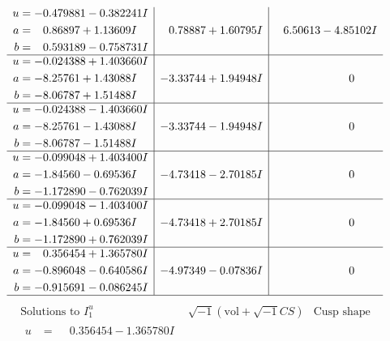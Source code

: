 \documentclass[1p]{elsarticle_modified}
\theoremstyle{definition}
\newcommand{\I}{\sqrt{-1}}
\begin{document}
$$\begin{array}{c|c|c}
\begin{aligned}
u &= -0.479881 - 0.382241 I \\
a &= \phantom{-}0.86897 + 1.13609 I \\
b &= \phantom{-}0.593189 - 0.758731 I\end{aligned}
 & \phantom{-}0.78887 + 1.60795 I & \phantom{-}6.50613 - 4.85102 I \\ \hline\begin{aligned}
u &= -0.024388 + 1.403660 I \\
a &= -8.25761 + 1.43088 I \\
b &= -8.06787 + 1.51488 I\end{aligned}
 & -3.33744 + 1.94948 I & \phantom{-0.000000 } 0 \\ \hline\begin{aligned}
u &= -0.024388 - 1.403660 I \\
a &= -8.25761 - 1.43088 I \\
b &= -8.06787 - 1.51488 I\end{aligned}
 & -3.33744 - 1.94948 I & \phantom{-0.000000 } 0 \\ \hline\begin{aligned}
u &= -0.099048 + 1.403400 I \\
a &= -1.84560 - 0.69536 I \\
b &= -1.172890 - 0.762039 I\end{aligned}
 & -4.73418 - 2.70185 I & \phantom{-0.000000 } 0 \\ \hline\begin{aligned}
u &= -0.099048 - 1.403400 I \\
a &= -1.84560 + 0.69536 I \\
b &= -1.172890 + 0.762039 I\end{aligned}
 & -4.73418 + 2.70185 I & \phantom{-0.000000 } 0 \\ \hline\begin{aligned}
u &= \phantom{-}0.356454 + 1.365780 I \\
a &= -0.896048 - 0.640586 I \\
b &= -0.915691 - 0.086245 I\end{aligned}
 & -4.97349 - 0.07836 I & \phantom{-0.000000 } 0\\
 \hline 
 \end{array}$$\newpage$$\begin{array}{c|c|c}  
\text{Solutions to }I^u_{1}& \I (\text{vol} + \sqrt{-1}CS) & \text{Cusp shape}\\
 \hline 
\begin{aligned}
u &= \phantom{-}0.356454 - 1.365780 I \\

\end{aligned}
\end{array}$$
\end{document}
